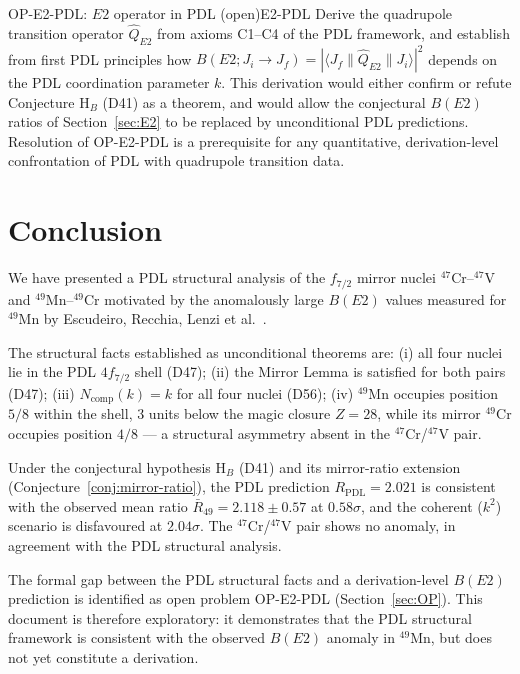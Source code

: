\documentclass[12pt,a4paper]{article}
\theoremstyle{remark}
\begin{document}
\begin{pdlopenproblem}{OP-E2-PDL: $E2$ operator in PDL (open)}{E2-PDL}
Derive the quadrupole transition operator $\hat{Q}_{E2}$ from axioms C1--C4 of the PDL framework, and establish from first PDL principles how $B(E2; J_i \to J_f) = |\langle J_f \| \hat{Q}_{E2} \| J_i \rangle|^2$ depends on the PDL coordination parameter $k$. This derivation would either confirm or refute Conjecture H$_B$ (D41) as a theorem, and would allow the conjectural $B(E2)$ ratios of Section~\ref{sec:E2} to be replaced by unconditional PDL predictions. Resolution of OP-E2-PDL is a prerequisite for any quantitative, derivation-level confrontation of PDL with quadrupole transition data.
\end{pdlopenproblem}

\section{Conclusion}
\label{sec:conclusion}

We have presented a PDL structural analysis of the $f_{7/2}$ mirror nuclei $^{47}$Cr--$^{47}$V and $^{49}$Mn--$^{49}$Cr motivated by the anomalously large $B(E2)$ values measured for $^{49}$Mn by Escudeiro, Recchia, Lenzi et al.\ \cite{Escudeiro_2026}.

The structural facts established as unconditional theorems are: (i) all four nuclei lie in the PDL $4f_{7/2}$ shell (D47); (ii) the Mirror Lemma is satisfied for both pairs (D47); (iii) $N_{\text{comp}}(k) = k$ for all four nuclei (D56); (iv) $^{49}$Mn occupies position $5/8$ within the shell, 3 units below the magic closure $Z = 28$, while its mirror $^{49}$Cr occupies position $4/8$ — a structural asymmetry absent in the $^{47}$Cr/$^{47}$V pair.

Under the conjectural hypothesis H$_B$ (D41) and its mirror-ratio extension (Conjecture~\ref{conj:mirror-ratio}), the PDL prediction $R_{\text{PDL}} = 2.021$ is consistent with the observed mean ratio $\bar{R}_{49} = 2.118 \pm 0.57$ at $0.58\sigma$, and the coherent ($k^2$) scenario is disfavoured at $2.04\sigma$. The $^{47}$Cr/$^{47}$V pair shows no anomaly, in agreement with the PDL structural analysis.

The formal gap between the PDL structural facts and a derivation-level $B(E2)$ prediction is identified as open problem OP-E2-PDL (Section~\ref{sec:OP}). This document is therefore exploratory: it demonstrates that the PDL structural framework is consistent with the observed $B(E2)$ anomaly in $^{49}$Mn, but does not yet constitute a derivation.
\end{document}
